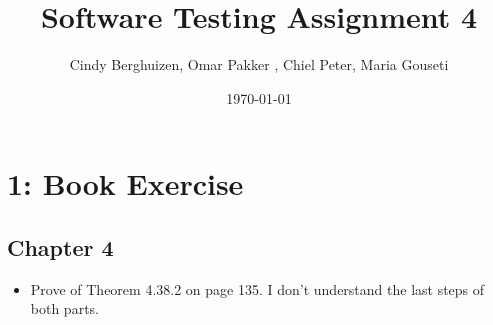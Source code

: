\documentclass{article}
\begin{document}
\setlength{\parindent}{0cm}
\title{Software Testing Assignment 4}
\author{Cindy Berghuizen, Omar Pakker , Chiel Peter, Maria Gouseti}
\date{\today}
\maketitle
\section*{1: Book Exercise}
\subsection*{Chapter 4}
\begin{itemize}
\item Prove of Theorem 4.38.2 on page 135. I don't understand the last steps of both parts.
\end{itemize}
\end{document}

